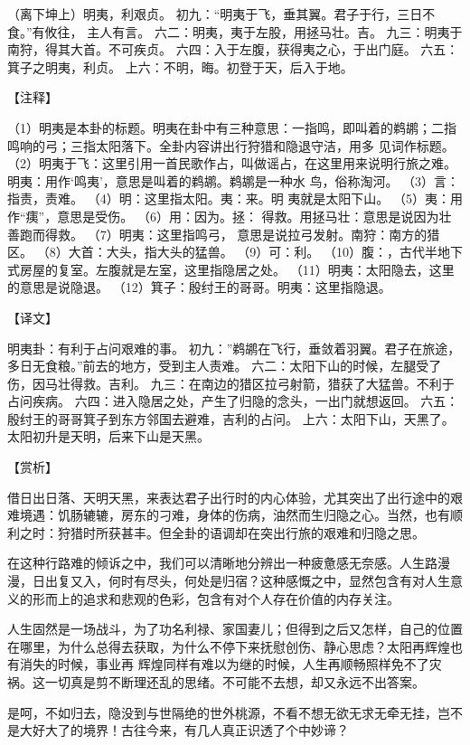 \documentclass[12pt,UTF8]{ctexbook}
\begin{document}
（离下坤上）明夷，利艰贞。
初九：“明夷于飞，垂其翼。君子于行，三日不食。”有攸往， 主人有言。
六二：明夷，夷于左股，用拯马壮。吉。
九三：明夷于南狩，得其大首。不可疾贞。
六四：入于左腹，获得夷之心，于出门庭。
六五：箕子之明夷，利贞。
上六：不明，晦。初登于天，后入于地。

【注释】

（1）明夷是本卦的标题。明夷在卦中有三种意思：一指鸣，即叫着的鹈鹕；二指鸣响的弓；三指太阳落下。全卦内容讲出行狩猎和隐退守洁，用多 见词作标题。
（2）明夷于飞：这里引用一首民歌作占，叫做谣占，在这里用来说明行旅之难。明夷：用作‘鸣夷’，意思是叫着的鹈鹕。鹈鹕是一种水 鸟，俗称淘河。
（3）言：指责，责难。
（4）明：这里指太阳。夷：来。明 夷就是太阳下山。
（5）夷：用作“痍”，意思是受伤。
（6）用：因为。拯： 得救。用拯马壮：意思是说因为壮善跑而得救。
（7）明夷：这里指鸣弓， 意思是说拉弓发射。南狩：南方的猎区。
（8）大首：大头，指大头的猛兽。
（9）可：利。
（10）腹：，古代半地下式房屋的复室。左腹就是左室，这里指隐居之处。
（11）明夷：太阳隐去，这里的意思是说隐退。
（12）箕子：殷纣王的哥哥。明夷：这里指隐退。

【译文】

明夷卦：有利于占问艰难的事。
初九：”鹈鹕在飞行，垂敛着羽翼。君子在旅途，多日无食粮。”前去的地方，受到主人责难。
六二：太阳下山的时候，左腿受了伤，因马壮得救。吉利。
九三：在南边的猎区拉弓射箭，猎获了大猛兽。不利于占问疾病。
六四：进入隐居之处，产生了归隐的念头，一出门就想返回。
六五：殷纣王的哥哥箕子到东方邻国去避难，吉利的占问。
上六：太阳下山，天黑了。太阳初升是天明，后来下山是天黑。

【赏析】

借日出日落、天明天黑，来表达君子出行时的内心体验，尤其突出了出行途中的艰难境遇：饥肠辘辘，房东的刁难，身体的伤病，油然而生归隐之心。当然，也有顺利之时：狩猎时所获甚丰。但全卦的语调却在突出行旅的艰难和归隐之思。

在这种行路难的倾诉之中，我们可以清晰地分辨出一种疲惫感无奈感。人生路漫漫，日出复又入，何时有尽头，何处是归宿？这种感慨之中，显然包含有对人生意义的形而上的追求和悲观的色彩，包含有对个人存在价值的内存关注。

人生固然是一场战斗，为了功名利禄、家国妻儿；但得到之后又怎样，自己的位置在哪里，为什么总得去获取，为什么不停下来抚慰创伤、静心思虑？太阳再辉煌也有消失的时候，事业再 辉煌同样有难以为继的时候，人生再顺畅照样免不了灾祸。这一切真是剪不断理还乱的思绪。不可能不去想，却又永远不出答案。

是呵，不如归去，隐没到与世隔绝的世外桃源，不看不想无欲无求无牵无挂，岂不是大好大了的境界！古往今来，有几人真正识透了个中妙谛？
\end{document}
